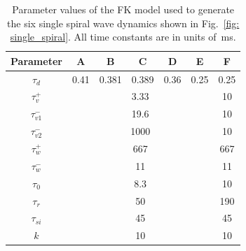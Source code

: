 
\begin{table}[htbp]
\centering
\caption{Parameter values of the FK model used to generate the six single spiral wave dynamics shown in Fig.~\ref{fig: single_spiral}. 
All time constants are in units of~ms.
}

\vspace{0.5em}
\begin{tabular}{c|c|c|c|c|c|c}
\hline\hline
\textbf{Parameter} & \textbf{A} & \textbf{B} & \textbf{C} & \textbf{D} & \textbf{E} & \textbf{F} \\
\hline
$\tau_d$           & 0.41 & 0.381  & 0.389  & 0.36   & 0.25   & 0.25 \\ \hline
$\tau_v^+$         & \multicolumn{5}{c|}{3.33} & 10 \\ \hline
$\tau_{v1}^-$      &  \multicolumn{5}{c|}{19.6}  & 10 \\ \hline
$\tau_{v2}^-$      & \multicolumn{5}{c|}{1000} & 10 \\ \hline
$\tau_w^+$         & \multicolumn{5}{c|}{667} & 667 \\ \hline
$\tau_w^-$         & \multicolumn{5}{c|}{11}  & 11 \\ \hline
$\tau_0$           & \multicolumn{5}{c|}{8.3} & 10 \\ \hline
$\tau_r$           & \multicolumn{5}{c|}{50} & 190 \\ \hline
$\tau_{si}$        & \multicolumn{5}{c|}{45} & 45 \\ \hline
$k$                & \multicolumn{5}{c|}{10} & 10 \\ \hline

\end{tabular}
\end{table}
